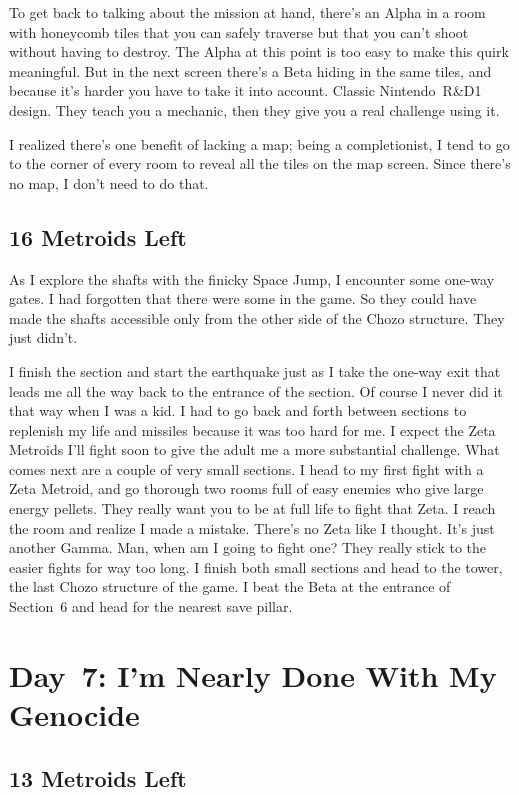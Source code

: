 \documentclass{book}
\begin{document}
To get back to talking about the mission at hand, there’s an Alpha in a room with honeycomb tiles that you can safely traverse but that you can’t shoot without having to destroy. The Alpha at this point is too easy to make this quirk meaningful. But in the next screen there’s a Beta hiding in the same tiles, and because it’s harder you have to take it into account. Classic Nintendo~R\&D1 design. They teach you a mechanic, then they give you a real challenge using it.\par
I realized there’s one benefit of lacking a map; being a completionist, I tend to go to the corner of every room to reveal all the tiles on the map screen. Since there’s no map, I don’t need to do that.\par
\FloatBarrier\subsection*{16 Metroids Left}
As I explore the shafts with the finicky Space Jump, I encounter some one-way gates. I had forgotten that there were some in the game. So they could have made the shafts accessible only from the other side of the Chozo structure. They just didn’t.\par
I finish the section and start the earthquake just as I take the one-way exit that leads me all the way back to the entrance of the section. Of course I never did it that way when I was a kid. I had to go back and forth between sections to replenish my life and missiles because it was too hard for me. I expect the Zeta Metroids I’ll fight soon to give the adult me a more substantial challenge. What comes next are a couple of very small sections. I head to my first fight with a Zeta Metroid, and go thorough two rooms full of easy enemies who give large energy pellets. They really want you to be at full life to fight that Zeta. I reach the room and realize I made a mistake. There’s no Zeta like I thought. It’s just another Gamma. Man, when am I going to fight one? They really stick to the easier fights for way too long. I finish both small sections and head to the tower, the last Chozo structure of the game. I beat the Beta at the entrance of Section~6 and head for the nearest save pillar.\par
\FloatBarrier\section*{Day~7: I’m Nearly Done With My Genocide}
\FloatBarrier\subsection*{13 Metroids Left}
\end{document}
